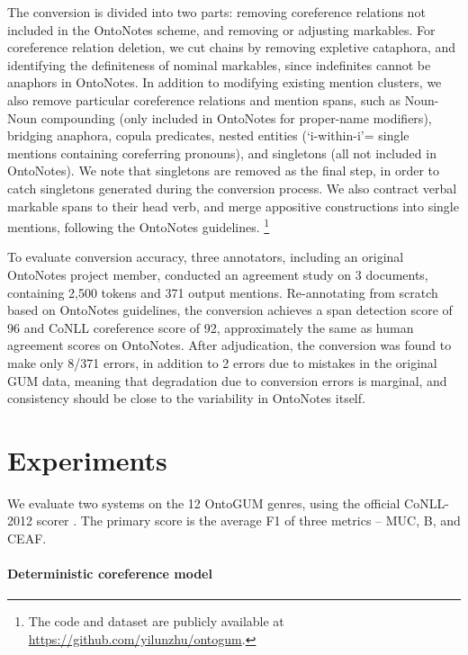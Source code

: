 \documentclass[11pt,a4paper]{article}
\begin{document}
The conversion is divided into two parts: removing coreference relations not included in the OntoNotes scheme, and removing or adjusting markables. For coreference relation deletion, we cut chains by removing expletive cataphora, and identifying the definiteness of nominal markables, since indefinites cannot be anaphors in OntoNotes. In addition to modifying existing mention clusters, we also remove particular coreference relations and mention spans, such as Noun-Noun compounding (only included in OntoNotes for proper-name modifiers), bridging anaphora, copula predicates, nested entities (`i-within-i'= single mentions containing coreferring pronouns), and singletons (all not included in OntoNotes). We note that singletons are removed as the final step, in order to catch singletons generated during the conversion process. We also contract verbal markable spans to their head verb, and merge appositive constructions into single mentions, following the OntoNotes guidelines.
\footnote{The code and dataset are publicly available at \url{https://github.com/yilunzhu/ontogum}.}

To evaluate conversion accuracy, three annotators, including an original OntoNotes project member, conducted an agreement study on 3 documents, containing 2,500 tokens and 371 output mentions. Re-annotating from scratch based on OntoNotes guidelines, the conversion achieves a span detection score of 96 and CoNLL coreference score of 92, approximately the same as human agreement scores on OntoNotes. After adjudication, the conversion was found to make only 8/371 errors, in addition to 2 errors due to mistakes in the original GUM data, meaning that degradation due to conversion errors is marginal, and consistency should be close to the variability in OntoNotes itself.







\section{Experiments}
We evaluate two systems on the 12 OntoGUM genres, using the official CoNLL-2012 scorer \cite{pradhan-etal-2012-conll, pradhan-etal-2014-scoring}. The primary score is the average F1 of three metrics -- MUC, B, and CEAF.

\paragraph{Deterministic coreference model}
\end{document}
